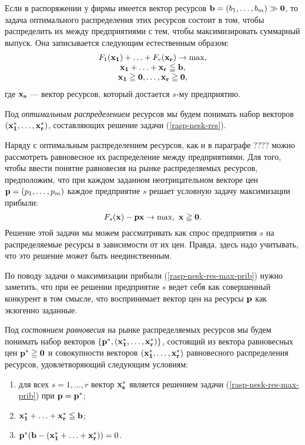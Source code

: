    Если в распоряжении у фирмы имеется вектор ресурсов
    $\mathbf{b}=(b_{1},\ldots,b_{m})\gg\mathbf{0}$, то задача оптимального
    распределения этих ресурсов состоит в том, чтобы распределить
    их между предприятиями с тем, чтобы максимизировать суммарный
    выпуск. Она записывается следующим естественным образом:
\begin{equation}
    \label{rasp-nesk-res}
    \begin{array}{c}
      F_{1}(\mathbf{x_{1}})+\ldots+F_{r}(\mathbf{x_{r}})\rightarrow \max, \\
      \mathbf{x_{1}}+\ldots+\mathbf{x_{r}}\leqq\mathbf{b}, \\
      \mathbf{x_{1}}\geqq\mathbf{0},\ldots,\mathbf{x_{r}}\geqq\mathbf{0},
    \end{array}
\end{equation}
    где $\mathbf{x_{s}}$ --- вектор ресурсов, который достается $s$-му
    предприятию.

    Под \emph{оптимальным распределением} ресурсов мы будем понимать набор
    векторов $(\mathbf{x_{1}^{*}},\ldots,\mathbf{x_{r}^{*}})$, составляющих
    решение задачи (\ref{rasp-nesk-res}).

    Наряду с оптимальным распределением ресурсов, как и в параграфе
    ???? можно рассмотреть равновесное их распределение между
    предприятиями. Для того, чтобы ввести понятие равновесия на
    рынке распределяемых ресурсов, предположим, что при каждом
    заданном неотрицательном векторе цен
    $\mathbf{p}=(p_{1},\ldots,p_{m})$ каждое предприятие $s$ решает
    условную задачу максимизации прибыли:
\begin{equation}
    \label{rasp-nesk-res-max-prib}
    F_{s}(\vc{x})-\vc{p}\vc{x}\rightarrow\max, \ \vc{x}\geqq\vc{0}.
\end{equation}
    Решение этой задачи мы можем рассматривать как спрос предприятия $s$ на
    распределяемые ресурсы в зависимости от их цен. Правда, здесь
    надо учитывать, что это решение может быть неединственным.

    По поводу задачи о максимизации прибыли (\ref{rasp-nesk-res-max-prib})
    нужно заметить, что при ее решении предприятие $s$ ведет себя
    как совершенный конкурент в том смысле, что воспринимает вектор
    цен на ресурсы $\mathbf{p}$ как экзогенно заданные.


    Под \emph{состоянием равновесия} на рынке распределяемых
    ресурсов мы будем понимать набор векторов
    $\{\mathbf{p^{*}}, (\mathbf{x_{1}^{*}},\ldots,\mathbf{x_{r}^{*}})\}$,
    состоящий из вектора равновесных цен $\mathbf{p^{*}}\geqq\mathbf{0}$ и
    совокупности векторов $(\mathbf{x_{1}^{*}},\ldots,\mathbf{x_{r}^{*}})$
    равновесного распределения ресурсов, удовлетворяющий следующим
    условиям:
\begin{enumerate}
  \item для всех $s=1,\ldots,r$ вектор $\mathbf{x_{s}^{*}}$ является
    решением задачи (\ref{rasp-nesk-res-max-prib}) при
    $\mathbf{p}=\mathbf{p^{*}}$;
  \item $\mathbf{x_{1}^{*}}+\ldots+\mathbf{x_{r}^{*}}\leqq\mathbf{b}$;
  \item
  $\mathbf{p^{*}}(\mathbf{b}-(\mathbf{x_{1}^{*}}+\ldots+\mathbf{x_{r}^{*}}))=0$.
\end{enumerate}


